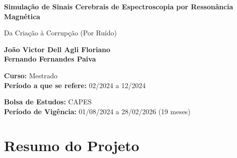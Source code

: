 \documentclass[12pt]{article}
\begin{document}
\begin{titlepage}
    \begin{center}
        \vspace*{1cm}
            
        \Huge
        \textbf{Simulação de Sinais Cerebrais de Espectroscopia por 
        Ressonância Magnética}
            
        \vspace{0.5cm}
        \LARGE
        Da Criação à Corrupção (Por Ruído)
            
        \vspace{1.5cm}
            
        \textbf{João Victor Dell Agli Floriano \\ Fernando Fernandes Paiva}

            
        \vfill
            
        \textbf{Curso:} Mestrado \\
        \textbf{Período a que se refere:} 02/2024 a 12/2024
            
        \vspace{0.8cm}
            
        \Large
        \textbf{Bolsa de Estudos:} CAPES \\
        \textbf{Período de Vigência:} 01/08/2024 a 28/02/2026 (19 meses)
            
    \end{center}
\end{titlepage}


\section{Resumo do Projeto}
\end{document}
